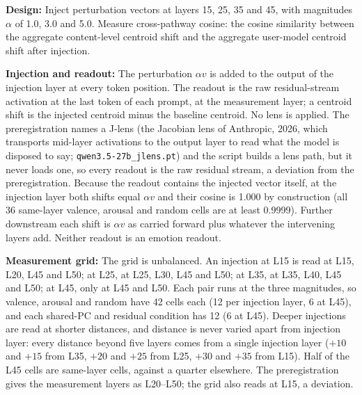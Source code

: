 \documentclass[11pt,a4paper]{article}
\begin{document}
\textbf{Design:} Inject perturbation vectors at layers 15, 25, 35 and 45, with magnitudes $\alpha$ of 1.0, 3.0 and 5.0. Measure cross-pathway cosine: the cosine similarity between the aggregate content-level centroid shift and the aggregate user-model centroid shift after injection.

\textbf{Injection and readout:} The perturbation $\alpha v$ is added to the output of the injection layer at every token position. The readout is the raw residual-stream activation at the last token of each prompt, at the measurement layer; a centroid shift is the injected centroid minus the baseline centroid. No lens is applied. The preregistration names a J-lens (the Jacobian lens of Anthropic, 2026, which transports mid-layer activations to the output layer to read what the model is disposed to say; \texttt{qwen3.5-27b\_jlens.pt}) and the script builds a lens path, but it never loads one, so every readout is the raw residual stream, a deviation from the preregistration. Because the readout contains the injected vector itself, at the injection layer both shifts equal $\alpha v$ and their cosine is 1.000 by construction (all 36 same-layer valence, arousal and random cells are at least 0.9999). Further downstream each shift is $\alpha v$ as carried forward plus whatever the intervening layers add. Neither readout is an emotion readout.

\textbf{Measurement grid:} The grid is unbalanced. An injection at L15 is read at L15, L20, L45 and L50; at L25, at L25, L30, L45 and L50; at L35, at L35, L40, L45 and L50; at L45, only at L45 and L50. Each pair runs at the three magnitudes, so valence, arousal and random have 42 cells each (12 per injection layer, 6 at L45), and each shared-PC and residual condition has 12 (6 at L45). Deeper injections are read at shorter distances, and distance is never varied apart from injection layer: every distance beyond five layers comes from a single injection layer ($+10$ and $+15$ from L35, $+20$ and $+25$ from L25, $+30$ and $+35$ from L15). Half of the L45 cells are same-layer cells, against a quarter elsewhere. The preregistration gives the measurement layers as L20--L50; the grid also reads at L15, a deviation.
\end{document}
